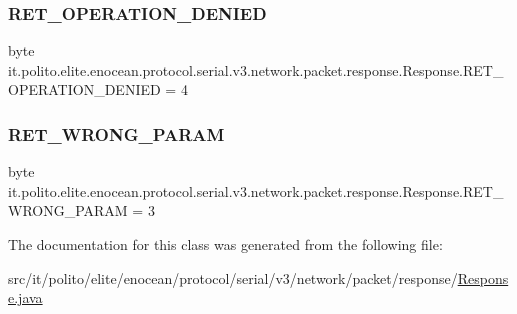 \subsubsection{\texorpdfstring{R\+E\+T\+\_\+\+O\+P\+E\+R\+A\+T\+I\+O\+N\+\_\+\+D\+E\+N\+I\+ED}{RET\_OPERATION\_DENIED}}
{\footnotesize\ttfamily byte it.\+polito.\+elite.\+enocean.\+protocol.\+serial.\+v3.\+network.\+packet.\+response.\+Response.\+R\+E\+T\+\_\+\+O\+P\+E\+R\+A\+T\+I\+O\+N\+\_\+\+D\+E\+N\+I\+ED = 4\hspace{0.3cm}{\ttfamily [static]}}

\hypertarget{classit_1_1polito_1_1elite_1_1enocean_1_1protocol_1_1serial_1_1v3_1_1network_1_1packet_1_1response_1_1_response_a84e77a2371ac0b20e982daddb03eaea0}{}\label{classit_1_1polito_1_1elite_1_1enocean_1_1protocol_1_1serial_1_1v3_1_1network_1_1packet_1_1response_1_1_response_a84e77a2371ac0b20e982daddb03eaea0} 
\subsubsection{\texorpdfstring{R\+E\+T\+\_\+\+W\+R\+O\+N\+G\+\_\+\+P\+A\+R\+AM}{RET\_WRONG\_PARAM}}
{\footnotesize\ttfamily byte it.\+polito.\+elite.\+enocean.\+protocol.\+serial.\+v3.\+network.\+packet.\+response.\+Response.\+R\+E\+T\+\_\+\+W\+R\+O\+N\+G\+\_\+\+P\+A\+R\+AM = 3\hspace{0.3cm}{\ttfamily [static]}}



The documentation for this class was generated from the following file\+:\begin{DoxyCompactItemize}
\item 
src/it/polito/elite/enocean/protocol/serial/v3/network/packet/response/\hyperlink{it_2polito_2elite_2enocean_2protocol_2serial_2v3_2network_2packet_2response_2_response_8java}{Response.\+java}\end{DoxyCompactItemize}

